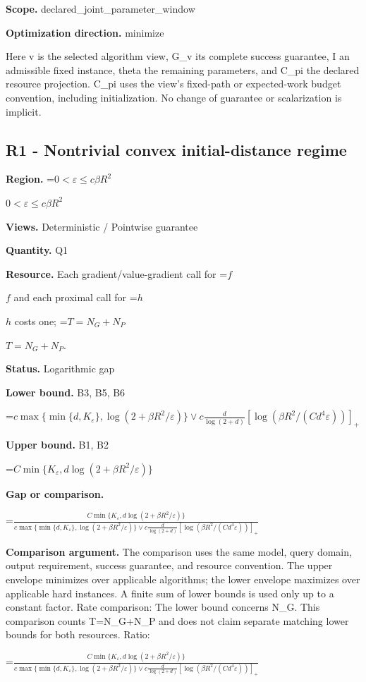 \documentclass[10pt,a4paper]{article}
\newcommand{\AtlasMath}[1]{\par\begingroup\centering\setbox0=\hbox{$\displaystyle #1$}\ifdim\wd0>1.4\linewidth\typeout{ATLAS WIDE FORMULA: \the\wd0}\fi\ifdim\wd0>\linewidth\resizebox{\linewidth}{!}{\box0}\else\box0\fi\par\endgroup}
\newcommand{\AtlasInlineMath}[1]{\begingroup\setbox0=\hbox{$#1$}\ifdim\wd0>.4\linewidth\endgroup\AtlasMath{#1}\else\endgroup$#1$\fi}
\begin{document}
\textbf{Scope.} declared\_joint\_parameter\_window

\textbf{Optimization direction.} minimize

Here v is the selected algorithm view, G\_v its complete success guarantee, I an admissible fixed instance, theta the remaining parameters, and C\_pi the declared resource projection. C\_pi uses the view's fixed-path or expected-work budget convention, including initialization. No change of guarantee or scalarization is implicit.

\subsection{R1 - Nontrivial convex initial-distance regime}
\textbf{Region.} \AtlasInlineMath{0<\varepsilon\le c\beta R^2}

\textbf{Views.} Deterministic / Pointwise guarantee

\textbf{Quantity.} Q1

\textbf{Resource.} Each gradient/value-gradient call for \AtlasInlineMath{f} and each proximal call for \AtlasInlineMath{h} costs one; \AtlasInlineMath{T=N_G+N_P}.

\textbf{Status.} Logarithmic gap

\textbf{Lower bound.} B3, B5, B6

\AtlasMath{c\max\{\min\{d,K_\varepsilon\},\log(2+\beta R^2/\varepsilon)\}\vee c\frac d{\log(2+d)}[\log(\beta R^2/(Cd^4\varepsilon))]_+}
\textbf{Upper bound.} B1, B2

\AtlasMath{C\min\{K_\varepsilon,d\log(2+\beta R^2/\varepsilon)\}}
\textbf{Gap or comparison.} 
\AtlasMath{\frac{C\min\{K_\varepsilon,d\log(2+\beta R^2/\varepsilon)\}}{c\max\{\min\{d,K_\varepsilon\},\log(2+\beta R^2/\varepsilon)\}\vee c\frac d{\log(2+d)}[\log(\beta R^2/(Cd^4\varepsilon))]_+}}


\textbf{Comparison argument.} The comparison uses the same model, query domain, output requirement, success guarantee, and resource convention. The upper envelope minimizes over applicable algorithms; the lower envelope maximizes over applicable hard instances. A finite sum of lower bounds is used only up to a constant factor. Rate comparison: The lower bound concerns N\_G. This comparison counts T=N\_G+N\_P and does not claim separate matching lower bounds for both resources. Ratio: 
\AtlasMath{\frac{C\min\{K_\varepsilon,d\log(2+\beta R^2/\varepsilon)\}}{c\max\{\min\{d,K_\varepsilon\},\log(2+\beta R^2/\varepsilon)\}\vee c\frac d{\log(2+d)}[\log(\beta R^2/(Cd^4\varepsilon))]_+}}
\end{document}
